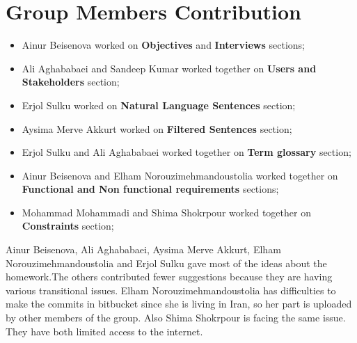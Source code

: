 \documentclass{article}
\begin{document}
\maketitle















\section{Group Members Contribution}
\begin{itemize}
\item Ainur Beisenova worked on \textbf{Objectives} and \textbf{Interviews} sections;
\item Ali Aghababaei and Sandeep Kumar worked together on \textbf{Users and Stakeholders} section;
\item Erjol Sulku worked on  \textbf{Natural Language Sentences} section;
\item Aysima Merve Akkurt worked on \textbf{Filtered Sentences} section;
\item Erjol Sulku and Ali Aghababaei worked together on \textbf{Term glossary} section;
\item Ainur Beisenova and Elham Norouzimehmandoustolia worked together on \textbf{Functional and Non functional requirements} sections;
\item Mohammad Mohammadi and Shima Shokrpour worked together on \textbf{Constraints} section;
\end{itemize}
Ainur Beisenova, Ali Aghababaei, Aysima Merve Akkurt, Elham Norouzimehmandoustolia and Erjol Sulku gave most of the ideas about the homework.The others contributed fewer suggestions because they are having various transitional issues. Elham Norouzimehmandoustolia has difficulties to make the commits in bitbucket since she is living in Iran, so her part is uploaded by other members of the group. Also Shima Shokrpour is facing the same issue. They have both limited access to the internet.
\end{document}
